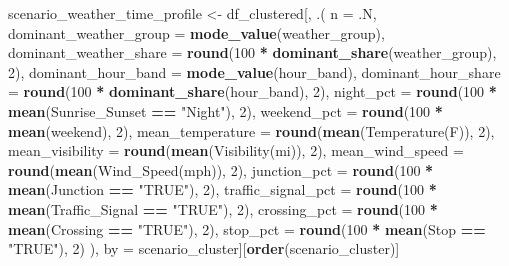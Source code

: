 \documentclass[
]{article}
\newenvironment{Shaded}{\begin{snugshade}}{\end{snugshade}}
\newcommand{\AttributeTok}[1]{\textcolor[rgb]{0.13,0.29,0.53}{#1}}
\newcommand{\DecValTok}[1]{\textcolor[rgb]{0.00,0.00,0.81}{#1}}
\newcommand{\FunctionTok}[1]{\textcolor[rgb]{0.13,0.29,0.53}{\textbf{#1}}}
\newcommand{\NormalTok}[1]{#1}
\newcommand{\OtherTok}[1]{\textcolor[rgb]{0.56,0.35,0.01}{#1}}
\newcommand{\SpecialCharTok}[1]{\textcolor[rgb]{0.81,0.36,0.00}{\textbf{#1}}}
\newcommand{\StringTok}[1]{\textcolor[rgb]{0.31,0.60,0.02}{#1}}
\begin{document}
\begin{Shaded}
\begin{Highlighting}[]
\NormalTok{scenario\_weather\_time\_profile }\OtherTok{\textless{}{-}}\NormalTok{ df\_clustered[, .(}
  \AttributeTok{n =}\NormalTok{ .N,}
  \AttributeTok{dominant\_weather\_group =} \FunctionTok{mode\_value}\NormalTok{(weather\_group),}
  \AttributeTok{dominant\_weather\_share =} \FunctionTok{round}\NormalTok{(}\DecValTok{100} \SpecialCharTok{*} \FunctionTok{dominant\_share}\NormalTok{(weather\_group), }\DecValTok{2}\NormalTok{),}
  \AttributeTok{dominant\_hour\_band =} \FunctionTok{mode\_value}\NormalTok{(hour\_band),}
  \AttributeTok{dominant\_hour\_share =} \FunctionTok{round}\NormalTok{(}\DecValTok{100} \SpecialCharTok{*} \FunctionTok{dominant\_share}\NormalTok{(hour\_band), }\DecValTok{2}\NormalTok{),}
  \AttributeTok{night\_pct =} \FunctionTok{round}\NormalTok{(}\DecValTok{100} \SpecialCharTok{*} \FunctionTok{mean}\NormalTok{(Sunrise\_Sunset }\SpecialCharTok{==} \StringTok{"Night"}\NormalTok{), }\DecValTok{2}\NormalTok{),}
  \AttributeTok{weekend\_pct =} \FunctionTok{round}\NormalTok{(}\DecValTok{100} \SpecialCharTok{*} \FunctionTok{mean}\NormalTok{(weekend), }\DecValTok{2}\NormalTok{),}
  \AttributeTok{mean\_temperature =} \FunctionTok{round}\NormalTok{(}\FunctionTok{mean}\NormalTok{(}\StringTok{\textasciigrave{}}\AttributeTok{Temperature(F)}\StringTok{\textasciigrave{}}\NormalTok{), }\DecValTok{2}\NormalTok{),}
  \AttributeTok{mean\_visibility =} \FunctionTok{round}\NormalTok{(}\FunctionTok{mean}\NormalTok{(}\StringTok{\textasciigrave{}}\AttributeTok{Visibility(mi)}\StringTok{\textasciigrave{}}\NormalTok{), }\DecValTok{2}\NormalTok{),}
  \AttributeTok{mean\_wind\_speed =} \FunctionTok{round}\NormalTok{(}\FunctionTok{mean}\NormalTok{(}\StringTok{\textasciigrave{}}\AttributeTok{Wind\_Speed(mph)}\StringTok{\textasciigrave{}}\NormalTok{), }\DecValTok{2}\NormalTok{),}
  \AttributeTok{junction\_pct =} \FunctionTok{round}\NormalTok{(}\DecValTok{100} \SpecialCharTok{*} \FunctionTok{mean}\NormalTok{(Junction }\SpecialCharTok{==} \StringTok{"TRUE"}\NormalTok{), }\DecValTok{2}\NormalTok{),}
  \AttributeTok{traffic\_signal\_pct =} \FunctionTok{round}\NormalTok{(}\DecValTok{100} \SpecialCharTok{*} \FunctionTok{mean}\NormalTok{(Traffic\_Signal }\SpecialCharTok{==} \StringTok{"TRUE"}\NormalTok{), }\DecValTok{2}\NormalTok{),}
  \AttributeTok{crossing\_pct =} \FunctionTok{round}\NormalTok{(}\DecValTok{100} \SpecialCharTok{*} \FunctionTok{mean}\NormalTok{(Crossing }\SpecialCharTok{==} \StringTok{"TRUE"}\NormalTok{), }\DecValTok{2}\NormalTok{),}
  \AttributeTok{stop\_pct =} \FunctionTok{round}\NormalTok{(}\DecValTok{100} \SpecialCharTok{*} \FunctionTok{mean}\NormalTok{(Stop }\SpecialCharTok{==} \StringTok{"TRUE"}\NormalTok{), }\DecValTok{2}\NormalTok{)}
\NormalTok{), by }\OtherTok{=}\NormalTok{ scenario\_cluster][}\FunctionTok{order}\NormalTok{(scenario\_cluster)]}


\end{Highlighting}
\end{Shaded}
\end{document}
